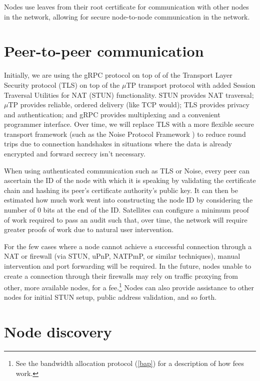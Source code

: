 \documentclass[11pt,fleqn,openany]{book}
\begin{document}
Nodes use leaves from their root certificate for communication with other
nodes in the network, allowing for secure node-to-node communication in the network.

\section{Peer-to-peer communication}

Initially, we are using the gRPC \cite{grpc} protocol on top of of the
Transport Layer Security protocol (TLS) on top of the $\mu$TP
\cite{utp} transport protocol with added Session Traversal Utilities for NAT
(STUN) functionality. STUN provides NAT traversal; $\mu$TP provides reliable,
ordered delivery (like TCP would); TLS provides privacy and authentication;
and gRPC provides multiplexing and a convenient programmer interface.
Over time, we will replace TLS with a more flexible secure transport
framework (such as the Noise Protocol Framework \cite{noise-proto}) to
reduce round trips due to connection handshakes in situations where the data is
already encrypted and forward secrecy isn't necessary.

When using authenticated communication such as TLS or Noise, every peer can
ascertain the ID of the node with which it is
speaking by validating the certificate chain and hashing its peer's
certificate authority's public key. It can then be estimated how much work went
into constructing the node ID by considering the number of 0 bits at the end of
the ID. Satellites can configure a minimum proof of work required to pass an
audit such that, over time, the network will require greater proofs of work
due to natural user intervention.

For the few cases where a node cannot achieve a successful connection through a
NAT or firewall (via STUN, uPnP, NATPmP, or similar techniques), manual
intervention and port forwarding will be required. In the future, nodes unable
to create a connection through their firewalls may rely on traffic proxying from
other, more available nodes, for a fee.\footnote{See the bandwidth allocation
protocol (\ref{bap}) for a description of how fees work.} Nodes can also provide
assistance to other nodes for initial STUN setup, public address validation,
and so forth.

\section{Node discovery}\label{sec:concrete-node-discovery}
\end{document}
